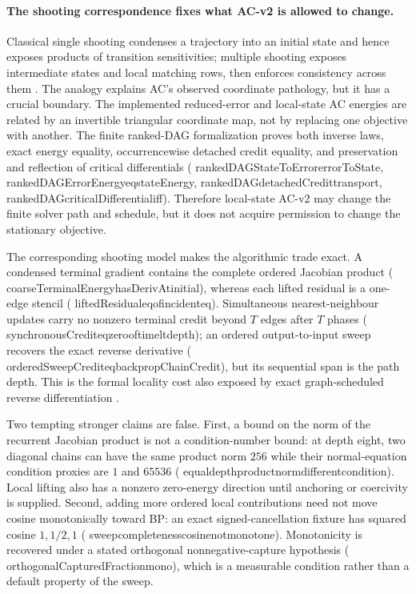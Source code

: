 \documentclass[11pt]{article}
\newcommand{\leanname}[1]{{\scriptsize\ttfamily
  \def\_{\textunderscore\allowbreak}#1}}
\begin{document}
\paragraph{The shooting correspondence fixes what AC-v2 is allowed to change.}
Classical single shooting condenses a trajectory into an initial state and hence exposes
products of transition sensitivities; multiple shooting exposes intermediate states and
local matching rows, then enforces consistency across them
\cite{bockplitt1984,mattheij1982,massaroli2021,prabhu2025shooting}. The analogy explains
AC's observed coordinate pathology, but it has a crucial boundary. The implemented
reduced-error and local-state AC energies are related by an invertible triangular
coordinate map, not by replacing one objective with another. The finite ranked-DAG
formalization proves both inverse laws, exact energy equality, occurrencewise detached
credit equality, and preservation and reflection of critical differentials
(\leanname{rankedDAGStateToError\_errorToState},
\leanname{rankedDAGErrorEnergy\_eq\_stateEnergy},
\leanname{rankedDAG\_detachedCredit\_transport},
\leanname{rankedDAG\_criticalDifferential\_iff}). Therefore local-state AC-v2 may change
the finite solver path and schedule, but it does not acquire permission to change the
stationary objective.

The corresponding shooting model makes the algorithmic trade exact. A condensed
terminal gradient contains the complete ordered Jacobian product
(\leanname{coarseTerminalEnergy\_hasDerivAt\_initial}), whereas each lifted residual is
a one-edge stencil (\leanname{liftedResidual\_eq\_of\_incident\_eq}). Simultaneous
nearest-neighbour updates carry no nonzero terminal credit beyond $T$ edges after $T$
phases (\leanname{synchronousCredit\_eq\_zero\_of\_time\_lt\_depth}); an ordered
output-to-input sweep recovers the exact reverse derivative
(\leanname{orderedSweepCredit\_eq\_backpropChainCredit}), but its sequential span is the
path depth. This is the formal locality cost also exposed by exact graph-scheduled
reverse differentiation \cite{salvatori2021reverse}.

Two tempting stronger claims are false. First, a bound on the norm of the recurrent
Jacobian product is not a condition-number bound: at depth eight, two diagonal chains
can have the same product norm $256$ while their normal-equation condition proxies are
$1$ and $65536$ (\leanname{equal\_depth\_product\_norm\_different\_condition}). Local
lifting also has a nonzero zero-energy direction until anchoring or coercivity is
supplied. Second, adding more ordered local contributions need not move cosine
monotonically toward BP: an exact signed-cancellation fixture has squared cosine
$1,1/2,1$ (\leanname{sweep\_completeness\_cosine\_not\_monotone}). Monotonicity is
recovered under a stated orthogonal nonnegative-capture hypothesis
(\leanname{orthogonalCapturedFraction\_mono}), which is a measurable condition rather
than a default property of the sweep.
\end{document}
